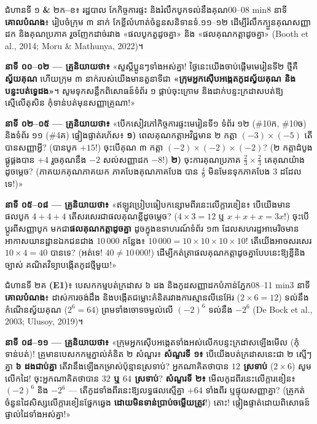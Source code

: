 \documentclass[a4paper,12pt]{article}
\newcommand{\en}[1]{{\TimesEn #1}}
\newcommand{\enbf}[1]{{\TimesEn\textbf{#1}}}
\begin{document}
\Needspace{1.5cm}
\begin{phasebox}{ជំហានទី ១ \enbf{\&} ២ក\enbf{--}ខ៖ រដ្ឋបាល កែកិច្ចការផ្ទះ និងរំលឹកបូកទល់នឹងគុណ}{00--08 min}{8 នាទី}
\textbf{គោលបំណង}៖ រៀបចំក្រុម ៣ នាក់ កែខ្លីលំហាត់ចំនួនសនិទានទំ\en{.}១១\en{--}១២ ដើម្បីរំលឹកក្បួនគុណសញ្ញាដក និងគុណប្រភាគ រួចញែកដាច់រវាង «ផលបូកតួដូចគ្នា» និង «ផលគុណកត្តាដូចគ្នា» \en{(Booth et al., 2014; Moru \& Mathunya, 2022)}។
\end{phasebox}
\begin{scriptbox}
  \textbf{នាទី ០០\en{--}០២ — គ្រូនិយាយថា៖} «សួស្ដីប្អូនៗទាំងអស់គ្នា! ថ្ងៃនេះយើងចាប់ផ្ដើមមេរៀនទី២ ថ្មីគឺ \textbf{ស្វ័យគុណ} ហើយក្រុម ៣ នាក់របស់យើងមានតួនាទីជា \textbf{«ក្រុមអ្នកស៊ើបអង្កេតកូដស្វ័យគុណ និងបន្ទះបត់ទ្វេដង»}។ សូមទុកសន្លឹកពិសោធន៍ទំព័រ ១ ផ្កាប់ចុះក្រោម និងដាក់បន្ទះក្រដាសបត់ឱ្យស្មើលើតុសិន កុំទាន់បត់មុនសញ្ញាគ្រូណា!»\par\vspace{0.5pt}
  \textbf{នាទី ០២\en{--}០៥ — គ្រូនិយាយថា៖} «បើកសៀវភៅកិច្ចការផ្ទះមេរៀនទី១ ទំព័រ ១២ (\en{\#10}ក\en{, \#10}ច) និងទំព័រ ១១ (\en{\#4}គ) ផ្ទៀងផ្ទាត់រហ័ស៖ \textbf{១)} ពេលគុណកត្តាអវិជ្ជមាន ២ កត្តា $(-3)\times(-5)$ តើបានសញ្ញាអ្វី? (បានបូក $+15$!) ចុះបើគុណ ៣ កត្តា $(-2)\times(-2)\times(-2)$? (២ កត្តាដំបូងផ្គូផ្គងបាន $+4$ រួចគុណនឹង $-2$ សល់សញ្ញាដក $-8$!) \textbf{២)} ចុះការគុណប្រភាគ $\frac{2}{3}\times\frac{2}{3}$ គេគុណយ៉ាងដូចម្ដេច? (ភាគយកគុណភាគយក ភាគបែងគុណភាគបែង បាន $\frac{4}{9}$ មិនមែនទុកភាគបែង $3$ ដដែលទេ!)»\par\vspace{0.5pt}
  \textbf{នាទី ០៥\en{--}០៨ — គ្រូនិយាយថា៖} «ឥឡូវប្រៀបធៀបកន្សោមពីរនេះលើក្ដារខៀន៖ បើយើងមានផលបូក $4 + 4 + 4$ តើសរសេរជាផលគុណខ្លីដូចម្ដេច? ($4\times 3 = 12$ ឬ $x+x+x = 3x$!) ចុះបើប្ដូរពីសញ្ញាបូក មកជា\textbf{ផលគុណកត្តាដូចគ្នា} ដូចក្នុងឧទាហរណ៍ទំព័រ ១៣ ដែលសហរដ្ឋអាមេរិចមានអាកាសយានដ្ឋានឯកជនជាង $10\,000$ កន្លែង៖ $10\,000 = 10\times 10\times 10\times 10$! តើយើងអាចសរសេរ $10\times 4 = 40$ បានទេ? (អត់ទេ! $40 \neq 10\,000$!) ដើម្បីកត់ត្រាផលគុណកត្តាដូចគ្នាបែបនេះឱ្យខ្លីនិងច្បាស់ គណិតវិទ្យាបង្កើតកូដថ្មីមួយ!»
\end{scriptbox}

\Needspace{1.5cm}
\begin{phasebox}{ជំហានទី ២គ \enbf{(E1)}៖ បេសកកម្មបត់ក្រដាស ៦ ដង និងកូដសញ្ញាដកបំភាន់ភ្នែក}{08--11 min}{3 នាទី}
\textbf{គោលបំណង}៖ ដាស់ការចង់ដឹង និងបង្កើតជម្លោះគំនិតរវាងការស្មានលីនេអ៊ែរ ($2\times 6=12$) ទល់នឹងកំណើនស្វ័យគុណ ($2^6=64$) ព្រមទាំងចោទចម្ងល់លើ $(-2)^6$ ទល់នឹង $-2^6$ \en{(De Bock et al., 2003; Ulusoy, 2019)}។
\end{phasebox}
\begin{scriptbox}
  \textbf{នាទី ០៨\en{--}១១ — គ្រូនិយាយថា៖} «ក្រុមអ្នកស៊ើបអង្កេតទាំងអស់លើកបន្ទះក្រដាសឡើងមើល (កុំទាន់បត់)! គ្រូមានបេសកកម្មភ្នាល់គំនិត ២ សំណួរ៖ \textbf{សំណួរទី ១៖} បើយើងបត់ក្រដាសនេះជា ២ ស្មើៗគ្នា \textbf{៦ ដងជាប់គ្នា} តើវានឹងឡើងកម្រាស់ប៉ុន្មានស្រទាប់? អ្នកណាគិតថាបាន \textbf{$12$ ស្រទាប់} ($2\times 6$) សូមលើកដៃ! ចុះអ្នកណាគិតថាបាន \textbf{$32$ ឬ $64$ ស្រទាប់}? \textbf{សំណួរទី ២៖} មើលកូដពីរនេះលើក្ដារខៀន៖ $(-2)^6$ និង $-2^6$ — តើកូដទាំងពីរនេះឱ្យលទ្ធផលស្មើគ្នា $+64$ ទាំងពីរ ឬផ្ទុយសញ្ញាគ្នា? (គ្រូកត់ចំនួនដៃសិស្សលើក្ដារខៀនផ្នែកឆ្វេង \textbf{ដោយមិនទាន់ប្រាប់ចម្លើយត្រូវ}!) តោះ! ផ្ទៀងផ្ទាត់ដោយពិសោធន៍ផ្ទាល់ដៃទាំងអស់គ្នា!»
\end{scriptbox}
\end{document}
